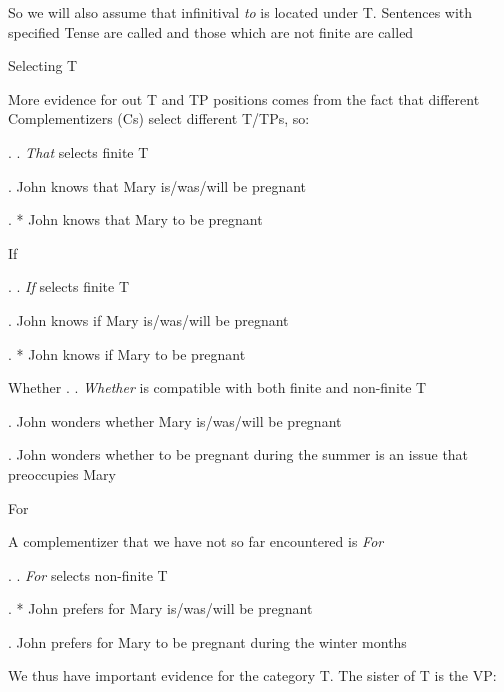 {\begin{frame}
So we will also assume that infinitival \textit{to} is located under T.
Sentences with specified Tense are called  and those which are not finite are called  



\end{frame}


\begin{frame}
  {Selecting T}

More evidence for out T and TP positions comes from the fact that different Complementizers (Cs) select different T/TPs, so:

\ex.
\a. \textit{That} selects finite T

\ex. John knows that Mary is/was/will be pregnant

\ex. * John knows that Mary to be pregnant




\end{frame}
\begin{frame}
  {If}

\ex.
\a. \textit{If} selects finite T

\ex. John knows if Mary is/was/will be pregnant

\ex. * John knows if Mary to be pregnant

\end{frame}

\begin{frame}
  {Whether}
\ex.
\a. \textit{Whether} is compatible with both finite and non-finite T

\ex. John wonders whether Mary is/was/will be pregnant

\ex. John wonders whether to be pregnant during the summer is an issue that preoccupies Mary 

\end{frame}

\begin{frame}
  {For}

A complementizer that we have not so far encountered is \textit{For}


\ex.
\a. \textit{For} selects non-finite T

\ex. * John prefers for Mary is/was/will be pregnant

\ex.  John prefers for Mary to be pregnant during the winter months


\end{frame}

\begin{frame}
  We thus have important evidence for the category T.  The sister of T is the VP:


\end{frame}}
